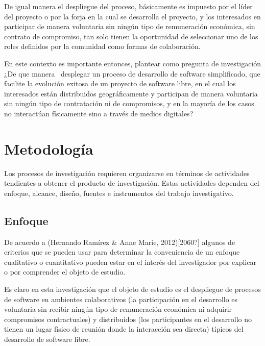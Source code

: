 De igual manera el despliegue del proceso, básicamente es impuesto por el líder del proyecto o por la forja en la cual se desarrolla el proyecto, y los interesados en participar de manera voluntaria sin ningún tipo de remuneración económica, sin contrato de compromiso, tan solo tienen la oportunidad de seleccionar uno de los roles definidos por la comunidad como formas de colaboración.

En este contexto es importante entonces, plantear como pregunta de investigación ¿De que manera \ desplegar un proceso de desarrollo de software simplificado, que facilite la evolución exitosa de un proyecto de software libre, en el cual los interesados están distribuidos geográficamente y participan de manera voluntaria sin ningún tipo de contratación ni de compromisos, y en la mayoría de los casos no interactúan físicamente sino a través de medios digitales?
\section{Metodología}

Los procesos de investigación requieren organizarse en términos de actividades tendientes a obtener el producto de investigación. Estas actividades dependen del enfoque, alcance, diseño, fuentes e instrumentos del trabajo investigativo.

\subsection{Enfoque}
De acuerdo a \cite{HernandoRamirez2012}(Hernando Ramírez \& Anne Marie, 2012)[2060?] algunos de criterios que se pueden usar para determinar la conveniencia de un enfoque cualitativo o cuantitativo pueden estar en el interés del investigador por explicar o por comprender el objeto de estudio.

Es claro en esta investigación que el objeto de estudio es el despliegue de procesos de software en ambientes colaborativos (la participación en el desarrollo es voluntaria sin recibir ningún tipo de remuneración económica ni adquirir compromisos contractuales) y distribuidos (los participantes en el desarrollo no tienen un lugar físico de reunión donde la interacción sea directa) típicos del desarrollo de software libre.

